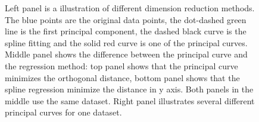 \documentclass[12pt]{article}
\begin{document}
\begin{figure}[H]
\caption[Principal curves and surfaces]{\footnotesize Left panel is a illustration of different dimension reduction methods. The blue points are the original data points, the dot-dashed green line is the first principal component, the dashed black curve is the spline fitting and the solid red curve is one of the principal curves. Middle panel shows the difference between the principal curve and the regression method: top panel shows that the principal curve minimizes the orthogonal distance, bottom panel shows that the spline regression minimize the distance in y axis. Both panels in the middle use the same dataset. Right panel illustrates several different principal curves for one dataset.}
\label{fig.def}
\begin{minipage}[b]{0.45\linewidth}
\centering
{}
\end{minipage}
\hspace{-1.2cm}
\begin{minipage}[b]{0.45\linewidth}
\centering
{}
\end{minipage}
\end{figure}
\end{document}
